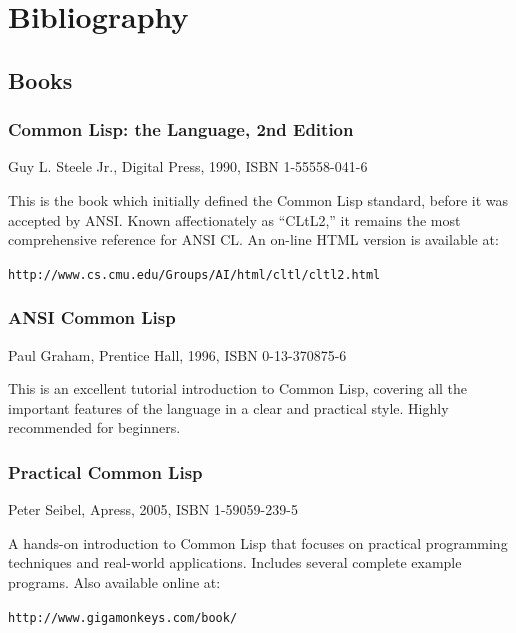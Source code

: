 \chapter{Bibliography}

\section{Books}

\subsection{Common Lisp: the Language, 2nd Edition}

Guy L. Steele Jr., Digital Press, 1990, ISBN 1-55558-041-6

This is the book which initially defined the Common Lisp standard, before it was accepted
by ANSI. Known affectionately as ``CLtL2,'' it remains the most comprehensive reference
for ANSI CL. An on-line HTML version is available at:

\begin{center}
\texttt{http://www.cs.cmu.edu/Groups/AI/html/cltl/cltl2.html}
\end{center}

\subsection{ANSI Common Lisp}

Paul Graham, Prentice Hall, 1996, ISBN 0-13-370875-6

This is an excellent tutorial introduction to Common Lisp, covering all the important features
of the language in a clear and practical style. Highly recommended for beginners.

\subsection{Practical Common Lisp}

Peter Seibel, Apress, 2005, ISBN 1-59059-239-5

A hands-on introduction to Common Lisp that focuses on practical programming techniques
and real-world applications. Includes several complete example programs. Also available
online at:

\begin{center}
\texttt{http://www.gigamonkeys.com/book/}
\end{center}

